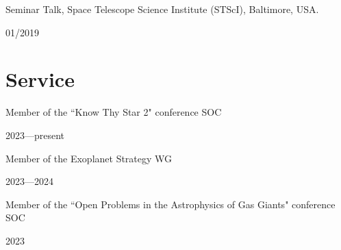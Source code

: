 \documentclass[12pt, a4paper]{article} %
\begin{document}
\begin{minipage}[t]{0.7\textwidth}
\begin{flushleft}%
  \setlength{\leftskip}{0.2cm}%
Seminar Talk, Space Telescope Science Institute (STScI), Baltimore, USA.
\end{flushleft}
\end{minipage}
\begin{minipage}[t]{0.3\textwidth}
\hfill 01/2019
\end{minipage}
\vspace{0.2cm}

\section*{Service}

\begin{minipage}[t]{0.7\textwidth}
\begin{flushleft}%
  \setlength{\leftskip}{0.2cm}%
Member of the ``Know Thy Star 2" conference SOC
\end{flushleft}
\end{minipage}
\begin{minipage}[t]{0.3\textwidth}
\hfill 2023---present
\end{minipage}

\vspace{0.3cm}

\begin{minipage}[t]{0.7\textwidth}
\begin{flushleft}%
  \setlength{\leftskip}{0.2cm}%
Member of the Exoplanet Strategy WG
\end{flushleft}
\end{minipage}
\begin{minipage}[t]{0.3\textwidth}
\hfill 2023---2024
\end{minipage}

\vspace{0.2cm}

\begin{minipage}[t]{0.7\textwidth}
\begin{flushleft}%
  \setlength{\leftskip}{0.2cm}%
Member of the ``Open Problems in the Astrophysics of Gas Giants" conference SOC
\end{flushleft}
\end{minipage}
\begin{minipage}[t]{0.3\textwidth}
\hfill 2023
\end{minipage}

\vspace{0.3cm}
\end{document}
